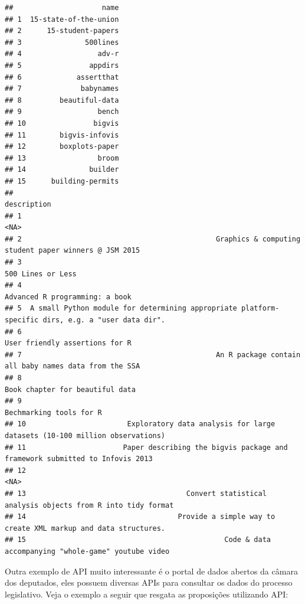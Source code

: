 \documentclass[]{book}
\newenvironment{Shaded}{\begin{snugshade}}{\end{snugshade}}
\newcommand{\KeywordTok}[1]{\textcolor[rgb]{0.13,0.29,0.53}{\textbf{#1}}}
\newcommand{\StringTok}[1]{\textcolor[rgb]{0.31,0.60,0.02}{#1}}
\newcommand{\OperatorTok}[1]{\textcolor[rgb]{0.81,0.36,0.00}{\textbf{#1}}}
\newcommand{\NormalTok}[1]{#1}
\begin{document}
\begin{verbatim}
##                     name
## 1  15-state-of-the-union
## 2      15-student-papers
## 3               500lines
## 4                  adv-r
## 5                appdirs
## 6             assertthat
## 7              babynames
## 8         beautiful-data
## 9                  bench
## 10                bigvis
## 11        bigvis-infovis
## 12        boxplots-paper
## 13                 broom
## 14               builder
## 15      building-permits
##                                                                                          description
## 1                                                                                               <NA>
## 2                                              Graphics & computing student paper winners @ JSM 2015
## 3                                                                                  500 Lines or Less
## 4                                                                     Advanced R programming: a book
## 5  A small Python module for determining appropriate platform-specific dirs, e.g. a "user data dir".
## 6                                                                     User friendly assertions for R
## 7                                              An R package contain all baby names data from the SSA
## 8                                                                    Book chapter for beautiful data
## 9                                                                            Bechmarking tools for R
## 10                        Exploratory data analysis for large datasets (10-100 million observations)
## 11                       Paper describing the bigvis package and framework submitted to Infovis 2013
## 12                                                                                              <NA>
## 13                                      Convert statistical analysis objects from R into tidy format
## 14                                    Provide a simple way to create XML markup and data structures.
## 15                                               Code & data accompanying "whole-game" youtube video
\end{verbatim}

Outra exemplo de API muito interessante é o portal de dados abertos da
câmara dos deputados, eles possuem diversas APIs para consultar os dados
do processo legislativo. Veja o exemplo a seguir que resgata as
proposições utilizando API:

\begin{Shaded}
\end{Shaded}
\end{document}
